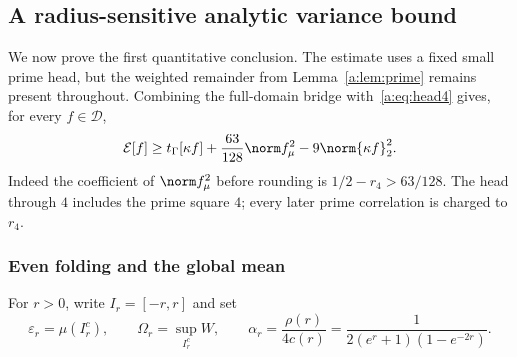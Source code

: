 \documentclass[11pt,a4paper]{article}
\numberwithin{equation}{section}
\theoremstyle{definition}\newtheorem{definition}[theorem]{Definition}
\theoremstyle{remark}\newtheorem{remark}[theorem]{Remark}
\newcommand{\E}{\mathcal E}\newcommand{\D}{\mathcal D}
\newcommand{\tg}{t_\Gamma}\newcommand{\cg}{c_\Gamma}
\begin{document}
\subsection{A radius-sensitive analytic variance bound}\label{a:sec:seed}

We now prove the first quantitative conclusion. The estimate uses a fixed small prime head, but the weighted remainder from Lemma~\ref{a:lem:prime} remains present throughout. Combining the full-domain bridge with~\eqref{a:eq:head4} gives, for every $f\in\D$,
\begin{equation}\label{a:eq:masscontrol}
 \E[f]\ge\tg[\kappa f]+\frac{63}{128}\norm f_\mu^2
                         -9\norm{\kappa f}_2^2.
\end{equation}
Indeed the coefficient of $\norm f_\mu^2$ before rounding is $1/2-r_4>63/128$. The head through $4$ includes the prime square $4$; every later prime correlation is charged to $r_4$.

\subsubsection{Even folding and the global mean}

For $r>0$, write $I_r=[-r,r]$ and set
\begin{equation}\label{a:eq:radiusdata}
 \varepsilon_r=\mu(I_r^c),\qquad
 \Omega_r=\sup_{I_r^c}W,\qquad
 \alpha_r=\frac{\rho(r)}{4c(r)}
 =\frac1{2(e^r+1)(1-e^{-2r})}.
\end{equation}
\end{document}
